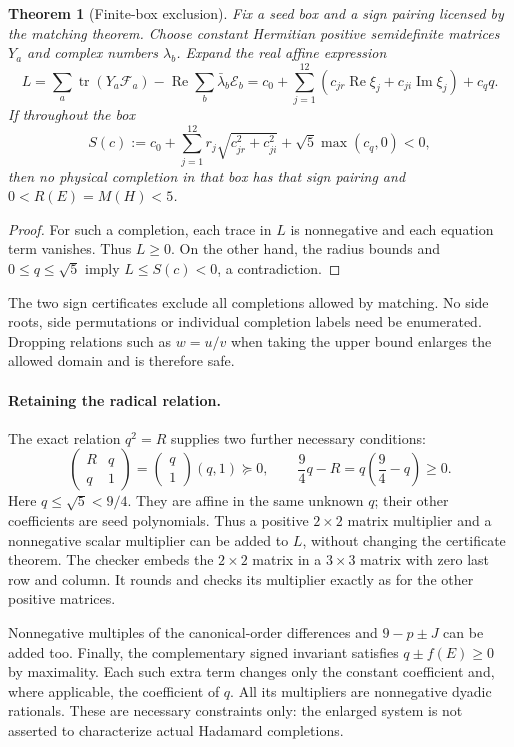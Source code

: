 \documentclass[11pt]{article}
\newtheorem{theorem}{Theorem}
\newcommand{\Rea}{\operatorname{Re}}
\newcommand{\Ima}{\operatorname{Im}}
\newcommand{\tr}{\operatorname{tr}}
\begin{document}
\begin{theorem}[Finite-box exclusion]
Fix a seed box and a sign pairing licensed by the matching theorem.
Choose constant Hermitian positive semidefinite matrices $Y_a$ and
complex numbers $\lambda_b$. Expand the real affine expression
\[
 L=\sum_a\tr(Y_a\mathcal F_a)
       -\Rea\sum_b\bar\lambda_b\mathcal E_b
   =c_0+\sum_{j=1}^{12}
      (c_{jr}\Rea\xi_j+c_{ji}\Ima\xi_j)+c_q q.
\]
If throughout the box
\begin{equation}\label{eq:support}
 S(c):=c_0+\sum_{j=1}^{12}r_j\sqrt{c_{jr}^2+c_{ji}^2}
                 +\sqrt5\max(c_q,0)<0,
\end{equation}
then no physical completion in that box has that sign pairing and
$0<R(E)=M(H)<5$.
\end{theorem}
\begin{proof}
For such a completion, each trace in $L$ is nonnegative and each
equation term vanishes. Thus $L\ge0$. On the other hand, the radius
bounds and $0\le q\le\sqrt5$ imply $L\le S(c)<0$, a contradiction.
\end{proof}

The two sign certificates exclude all completions allowed by matching.
No side roots, side permutations or individual completion labels
need be enumerated. Dropping relations such as $w=u/v$ when taking
the upper bound enlarges the allowed domain and is therefore safe.

\paragraph{Retaining the radical relation.}
The exact relation $q^2=R$ supplies two further necessary conditions:
\[
 \begin{pmatrix}R&q\\q&1\end{pmatrix}
 =\begin{pmatrix}q\\1\end{pmatrix}(q,1)\succeq0,
 \qquad \frac94q-R=q\left(\frac94-q\right)\ge0.
\]
Here $q\le\sqrt5<9/4$. They are affine in the same unknown $q$;
their other coefficients are seed polynomials. Thus a positive
$2\times2$ matrix multiplier and a nonnegative scalar multiplier
can be added to $L$, without changing the certificate theorem.
The checker embeds the $2\times2$ matrix in a $3\times3$ matrix with
zero last row and column. It rounds and checks its multiplier exactly
as for the other positive matrices.

Nonnegative multiples of the canonical-order differences and
$9-p\pm J$ can be added too. Finally, the complementary signed
invariant satisfies $q\pm f(E)\ge0$ by maximality. Each such extra
term changes only the constant coefficient and, where applicable,
the coefficient of $q$. All its multipliers are nonnegative dyadic
rationals. These are necessary constraints only: the enlarged system
is not asserted to characterize actual Hadamard completions.
\end{document}
